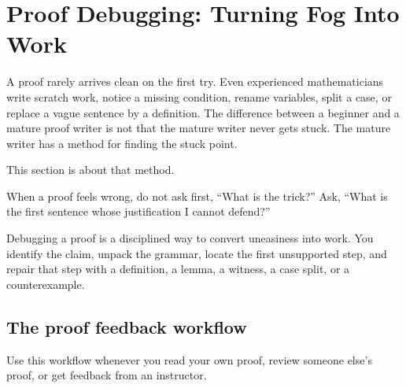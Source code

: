 \section{Proof Debugging: Turning Fog Into Work}
\chapterline

A proof rarely arrives clean on the first try. Even experienced mathematicians write scratch work, notice a missing condition, rename variables, split a case, or replace a vague sentence by a definition. The difference between a beginner and a mature proof writer is not that the mature writer never gets stuck. The mature writer has a method for finding the stuck point.

This section is about that method.

\begin{focusbox}
When a proof feels wrong, do not ask first, ``What is the trick?'' Ask, ``What is the first sentence whose justification I cannot defend?''
\end{focusbox}

Debugging a proof is a disciplined way to convert uneasiness into work. You identify the claim, unpack the grammar, locate the first unsupported step, and repair that step with a definition, a lemma, a witness, a case split, or a counterexample.

\subsection{The proof feedback workflow}

Use this workflow whenever you read your own proof, review someone else's proof, or get feedback from an instructor.

